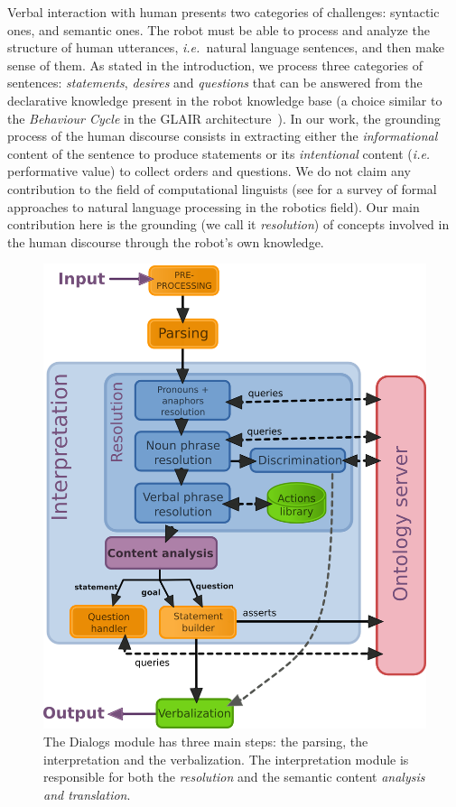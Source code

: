 \documentclass{svmult}
\newcommand{\ie}{{\textit{i.e.~}}}
\begin{document}
Verbal interaction with human presents two categories of challenges: syntactic
ones, and semantic ones. The robot must be able to process and analyze the
structure of human utterances, \ie natural language sentences, and then make
sense of them. As stated in the introduction, we process three categories of
sentences: \emph{statements}, \emph{desires} and \emph{questions} that can be
answered from the declarative knowledge present in the robot knowledge base (a
choice similar to the \emph{Behaviour Cycle} in the GLAIR
architecture~\cite{Shapiro2009}). In our work, the grounding process of the
human discourse consists in extracting either the \emph{informational} content
of the sentence to produce statements or its \emph{intentional} content (\ie
performative value) to collect orders and questions. We do not claim any
contribution to the field of computational linguists (see \cite{Kruijff2010}
for a survey of formal approaches to natural language processing in the
robotics field). Our main contribution here is the grounding (we call it
\emph{resolution}) of concepts involved in the human discourse through the
robot's own knowledge.

\begin{figure}[!t]
\centering
  \includegraphics[width=0.9\linewidth]{figs/dialog_module_simple.png}
  \caption{The {\sc Dialogs} module has three main steps: the parsing,
  the interpretation and the verbalization. The interpretation module is
  responsible for both the \emph{resolution} and the semantic content
  \emph{analysis and translation}.} 
  \label{fig|dialog}
\end{figure}
\end{document}
